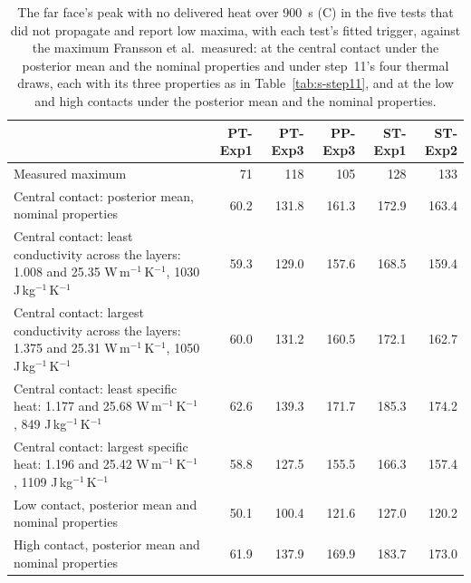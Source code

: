 \begin{table}[!htbp]
\centering
\footnotesize
\caption{The far face's peak with no delivered heat over 900~s (\textdegree C) in the five tests that did not propagate and report low maxima, with each test's fitted trigger, against the maximum Fransson et al.\ measured: at the central contact under the posterior mean and the nominal properties and under step~11's four thermal draws, each with its three properties as in Table~\ref{tab:s-step11}, and at the low and high contacts under the posterior mean and the nominal properties.}
\label{tab:s-farface}
\setlength{\tabcolsep}{3pt}
\begin{tabular}{>{\raggedright\arraybackslash}p{}rrrrr}
\toprule
 & PT-Exp1 & PT-Exp3 & PP-Exp3 & ST-Exp1 & ST-Exp2 \\
\midrule
Measured maximum & 71 & 118 & 105 & 128 & 133 \\
\midrule
Central contact: posterior mean, nominal properties & 60.2 & 131.8 & 161.3 & 172.9 & 163.4 \\
Central contact: least conductivity across the layers: 1.008 and 25.35 W\,m$^{-1}$\,K$^{-1}$, 1030 J\,kg$^{-1}$\,K$^{-1}$ & 59.3 & 129.0 & 157.6 & 168.5 & 159.4 \\
Central contact: largest conductivity across the layers: 1.375 and 25.31 W\,m$^{-1}$\,K$^{-1}$, 1050 J\,kg$^{-1}$\,K$^{-1}$ & 60.0 & 131.2 & 160.5 & 172.1 & 162.7 \\
Central contact: least specific heat: 1.177 and 25.68 W\,m$^{-1}$\,K$^{-1}$, 849 J\,kg$^{-1}$\,K$^{-1}$ & 62.6 & 139.3 & 171.7 & 185.3 & 174.2 \\
Central contact: largest specific heat: 1.196 and 25.42 W\,m$^{-1}$\,K$^{-1}$, 1109 J\,kg$^{-1}$\,K$^{-1}$ & 58.8 & 127.5 & 155.5 & 166.3 & 157.4 \\
\midrule
Low contact, posterior mean and nominal properties & 50.1 & 100.4 & 121.6 & 127.0 & 120.2 \\
High contact, posterior mean and nominal properties & 61.9 & 137.9 & 169.9 & 183.7 & 173.0 \\
\bottomrule
\end{tabular}
\end{table}
